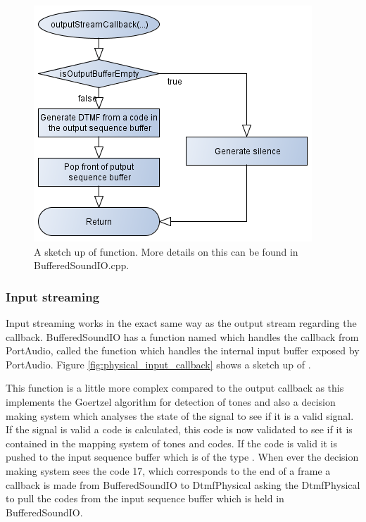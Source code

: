 		\begin{figure}[htb]
			\begin{center}
			\includegraphics[scale=0.7,trim=0 0 0 0]{content/graphics/physical/physical_output_callback.png}%
			\caption{A sketch up of  function. More details on this can be found in BufferedSoundIO.cpp.}
			\label{fig:physical_output_callback}
			\end{center}
		\end{figure}
		
		\subsubsection{Input streaming}
		Input streaming works in the exact same way as the output stream regarding the callback. BufferedSoundIO has a function named
		 which handles the callback from PortAudio,  called the 
		function which handles the internal input buffer exposed by PortAudio. Figure \ref{fig:physical_input_callback} shows a sketch up of .
		
		This function is a little more complex compared to the output callback as this implements the Goertzel algorithm for detection of tones and also
		a decision making system which analyses the state of the signal to see if it is a valid signal. If the signal is valid a code is calculated, this
		code is now validated to see if it is contained in the mapping system of tones and codes. If the code is valid it is pushed to the input
		sequence buffer which is of the type . When ever the decision making system sees the code 17,
		which corresponds to the end of a frame a callback is made from BufferedSoundIO to DtmfPhysical asking the DtmfPhysical to pull the codes from
		the input sequence buffer which is held in BufferedSoundIO.
		
